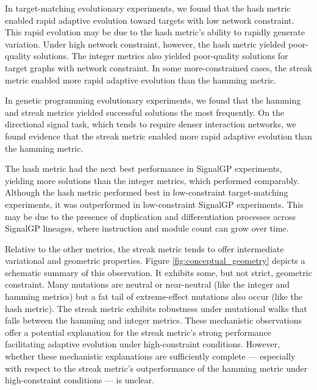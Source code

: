 In target-matching evolutionary experiments, we found that the hash metric enabled rapid adaptive evolution toward targets with low network constraint.
This rapid evolution may be due to the hash metric's ability to rapidly generate variation.
Under high network constraint, however, the hash metric yielded poor-quality solutions.
The integer metrics also yielded poor-quality solutions for target graphs with network constraint.
In some more-constrained cases, the streak metric enabled more rapid adaptive evolution than the hamming metric.


In genetic programming evolutionary experiments, we found that the hamming and streak metrics yielded successful solutions the most frequently.
On the directional signal task, which tends to require denser interaction networks, we found evidence that the streak metric enabled more rapid adaptive evolution than the hamming metric.

The hash metric had the next best performance in SignalGP experiments, yielding more solutions than the integer metrics, which performed comparably.
Although the hash metric performed best in low-constraint target-matching experiments, it was outperformed in low-constraint SignalGP experiments.
This may be due to the presence of duplication and differentiation processes across SignalGP lineages, where instruction and module count can grow over time.



Relative to the other metrics, the streak metric tends to offer intermediate variational and geometric properties.
Figure \ref{fig:conceptual_geometry} depicts a schematic summary of this observation.
It exhibits some, but not strict, geometric constraint.
Many mutations are neutral or near-neutral (like the integer and hamming metrics) but a fat tail of extreme-effect mutations also occur (like the hash metric).
The streak metric exhibits robustness under mutational walks that falls between the hamming and integer metrics.
These mechanistic observations offer a potential explanation for the streak metric's strong performance facilitating adaptive evolution under high-constraint conditions.
However, whether these mechanistic explanations are sufficiently complete --- especially with respect to the streak metric's outperformance of the hamming metric under high-constraint conditions --- is unclear.
